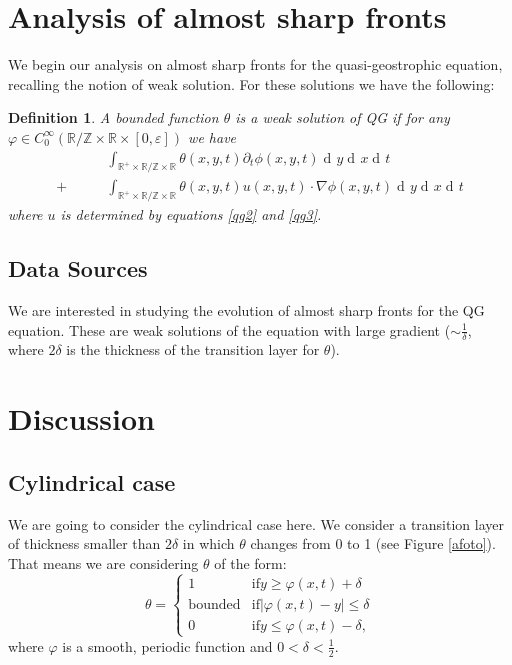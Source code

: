 \documentclass{pnas}
\DeclareMathOperator{\dif}{\mathrm{d}\!}
\newtheorem{definition}{Definition}
\begin{document}
\section{Analysis of almost sharp fronts}
We begin our analysis on almost sharp fronts for the quasi-geostrophic equation, recalling the notion of weak solution.
For these solutions we have the following:
\begin{definition}
A bounded function \( θ \) is a weak solution of QG if for any \( φ ∈ C_0^∞ (\mathbb{R} / \mathbb{Z} × \mathbb{R} × [0, ε]) \) we have
\begin{align}
& ∫_{\mathbb{R}^+ × \mathbb{R} / \mathbb{Z} × \mathbb{R}} θ(x, y, t) ∂_t ϕ(x, y, t) \dif{y}\dif{x}\dif{t} \nonumber \\
+ \hspace{2em} & ∫_{\mathbb{R}^+ × \mathbb{R} / \mathbb{Z} × \mathbb{R}} θ(x, y, t) u(x, y, t) · ∇ϕ(x, y, t) \dif{y}\dif{x}\dif{t} \label{qg4}
\end{align}
where $u$ is determined by equations \eqref{qg2} and \eqref{qg3}.
\end{definition}

\subsection{Data Sources}
We are interested in studying the evolution of almost sharp fronts for the QG equation.
These are weak solutions of the equation with large gradient (\( \sim\frac{1}{δ} \), where \( 2δ \) is the thickness of the transition layer for \( θ \)).


\section{Discussion}
\subsection{Cylindrical case}
We are going to consider the cylindrical case here.
We consider a transition layer of thickness smaller than \( 2δ \) in which \( θ \) changes from 0 to 1 (see Figure \ref{afoto}).
That means we are considering \( θ \) of the form:
\begin{equation}
θ = \begin{cases}
1 &\mathrm{if } y ≥ φ(x, t) + δ \\
\mathrm{bounded} &\mathrm{if } |φ(x, t) − y| ≤ δ \\
0 &\mathrm{if } y ≤ φ(x, t) − δ, \label{theta}
\end{cases}
\end{equation}
where \( φ \) is a smooth, periodic function and \( 0 < δ < \frac{1}{2} \).
\end{document}
